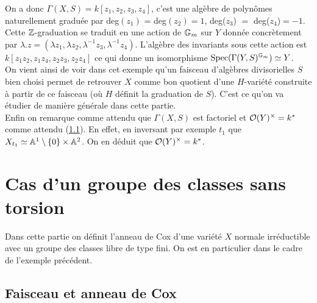On a donc $\Gamma(X, S)=k[z_1,z_2,z_3,z_4]$, c'est une algèbre de polynômes naturellement graduée par deg$(z_1)$ = deg$(z_2)=1$, deg($z_3$) $=$ deg($z_4$)$=-1$. Cette $\mathbb{Z}$-graduation se traduit en une action de $\mathbb{G}_m$ sur $Y$ donnée  concrètement par $\lambda.z=(\lambda z_1,\lambda z_2,\lambda^{-1} z_3,\lambda^{-1} z_4)$. L'algèbre des invariants sous cette action est $k[z_1z_2,z_1z_4,z_2z_3,z_2z_4]$ ce qui donne un isomorphisme $\operatorname{Spec}(\Gamma(Y,S)^{\mathbb{G}_m})\simeq Y$.\\ 
On vient ainsi de voir dans cet exemple qu'un faisceau d'algèbres divisorielles $S$ bien choisi permet de retrouver $X$ comme bon quotient d'une $H$-variété construite à partir de ce faisceau (où $H$ définit la graduation de $S$). C'est ce qu'on va étudier de manière générale dans cette partie.\\

Enfin on remarque comme attendu que $\Gamma(X, S)$ est factoriel et $\mathcal{O}(Y)^{\times}=k^*$ comme attendu (\ref{}). En effet, en inversant par exemple $t_1$  que $X_{t_1}\simeq \mathbb{A}^{1}\setminus \lbrace0\rbrace\times\mathbb{A}^{2}$. On en déduit que $\mathcal{O}(Y)^{\times}=k^*$.\\

\section{Cas d'un groupe des classes sans torsion}

Dans cette partie on définit l'anneau de Cox d'une variété $X$ normale irréductible avec un groupe des classes libre de type fini. On est en particulier dans le cadre de l'exemple précédent.

\subsection{Faisceau et anneau de Cox}

